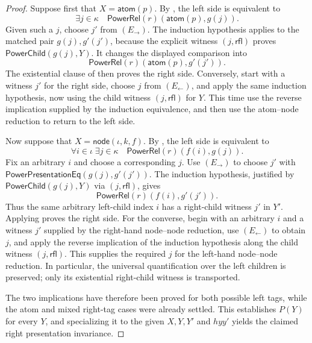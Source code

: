 \begin{proof}
Suppose first that $X=\mathsf{atom}(p)$.  By
, the left side is equivalent to
\[
\exists j\in\kappa\quad
\mathsf{PowerRel}(r)(\mathsf{atom}(p),g(j)).
\]
Given such a $j$, choose $j'$ from $(E_\to)$.  The induction hypothesis
applies to the matched pair $g(j),g'(j')$, because the explicit witness
$(j,\mathsf{rfl})$ proves $\mathsf{PowerChild}(g(j),Y)$.  It changes the
displayed comparison into
\[
\mathsf{PowerRel}(r)(\mathsf{atom}(p),g'(j')).
\]
The existential clause of  then proves the right
side.  Conversely, start with a witness $j'$ for the right side, choose
$j$ from $(E_\leftarrow)$, and apply the same induction hypothesis, now
using the child witness $(j,\mathsf{rfl})$ for $Y$.  This time use the
reverse implication supplied by the induction equivalence, and then use the
atom--node reduction to return to the left side.

Now suppose that $X=\mathsf{node}(\iota,k,f)$.  By
, the left side is equivalent to
\[
\forall i\in\iota\;\exists j\in\kappa\quad
\mathsf{PowerRel}(r)(f(i),g(j)).
\]
Fix an arbitrary $i$ and choose a corresponding $j$.  Use $(E_\to)$ to
choose $j'$ with
$\mathsf{PowerPresentationEq}(g(j),g'(j'))$.  The induction hypothesis,
justified by $\mathsf{PowerChild}(g(j),Y)$ via $(j,\mathsf{rfl})$, gives
\[
\mathsf{PowerRel}(r)(f(i),g'(j')).
\]
Thus the
same arbitrary left-child index $i$ has a right-child witness $j'$ in
$Y'$.  Applying  proves the right side.  For the
converse, begin with an arbitrary $i$ and a witness $j'$ supplied by the
right-hand node--node reduction, use $(E_\leftarrow)$ to obtain $j$, and
apply the reverse implication of the induction hypothesis along the child
witness $(j,\mathsf{rfl})$.  This supplies the required $j$ for the
left-hand node--node reduction.  In particular, the universal
quantification over the left children is preserved; only its existential
right-child witness is transported.

The two implications have therefore been proved for both possible left
tags, while the atom and mixed right-tag cases were already settled.  This
establishes $P(Y)$ for every $Y$, and specializing it to the given
$X,Y,Y'$ and $hyy'$ yields the claimed right presentation invariance.
\end{proof}
